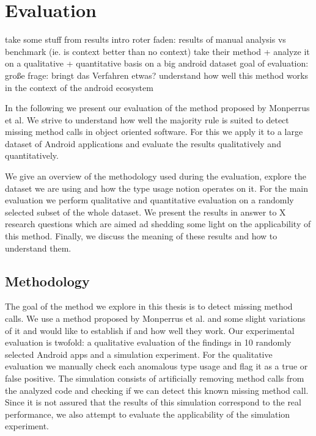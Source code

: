 \chapter{Evaluation}\label{ch:eval}

take some stuff from results intro
roter faden: results of manual analysis vs benchmark (ie. is context better than no context)
take their method + analyze it on a qualitative + quantitative basis on a big android dataset
goal of evaluation:
große frage: bringt das Verfahren etwas?
understand how well this method works in the context of the android ecosystem

In the following we present our evaluation of the method proposed by Monperrus et al.
We strive to understand how well the majority rule is suited to detect missing method calls in object oriented software.
For this we apply it to a large dataset of Android applications and evaluate the results qualitatively and quantitatively. 

We give an overview of the methodology used during the evaluation, explore the dataset we are using and how the type usage notion operates on it.
For the main evaluation we perform qualitative and quantitative evaluation on a randomly selected subset of the whole dataset.
We present the results in answer to X research questions which are aimed ad shedding some light on the applicability of this method.
Finally, we discuss the meaning of these results and how to understand them.

\section{Methodology}

The goal of the method we explore in this thesis is to detect missing method calls.
We use a method proposed by Monperrus et al. and some slight variations of it and would like to establish if and how well they work.
Our experimental evaluation is twofold: a qualitative evaluation of the findings in 10 randomly selected Android apps and a simulation experiment.
For the qualitative evaluation we manually check each anomalous type usage and flag it as a true or false positive.
The simulation consists of artificially removing method calls from the analyzed code and checking if we can detect this known missing method call.
Since it is not assured that the results of this simulation correspond to the real performance, we also attempt to evaluate the applicability of the simulation experiment.

